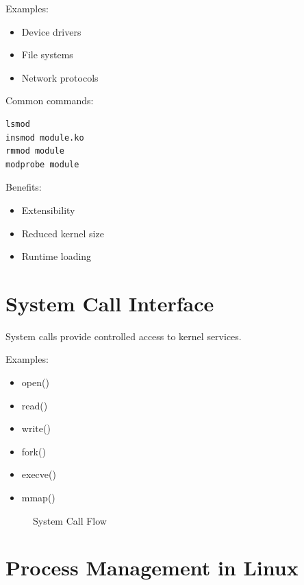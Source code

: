Examples:

\begin{itemize}
\item Device drivers
\item File systems
\item Network protocols
\end{itemize}

Common commands:

\begin{lstlisting}[style=interviewcode,basicstyle=\ttfamily\small]
lsmod
insmod module.ko
rmmod module
modprobe module
\end{lstlisting}

Benefits:

\begin{itemize}
\item Extensibility
\item Reduced kernel size
\item Runtime loading
\end{itemize}

\section{System Call Interface}

System calls provide controlled access to kernel services.

Examples:

\begin{itemize}
\item open()
\item read()
\item write()
\item fork()
\item execve()
\item mmap()
\end{itemize}

\begin{figure}[H]
\centering
{}
\caption{System Call Flow}
\end{figure}

\section{Process Management in Linux}

